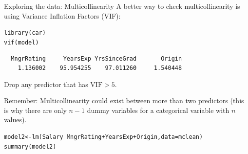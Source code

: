 \documentclass{beamer}\usepackage[]{graphicx}\usepackage[]{color}
\makeatletter
\newcommand{\hlopt}[1]{\textcolor[rgb]{1,0.894,0.769}{#1}}%
\newcommand{\hlstd}[1]{\textcolor[rgb]{1,0.894,0.769}{#1}}%
\newcommand{\hlkwb}[1]{\textcolor[rgb]{0.804,0.776,0.451}{#1}}%
\newcommand{\hlkwc}[1]{\textcolor[rgb]{0.78,0.941,0.545}{#1}}%
\newcommand{\hlkwd}[1]{\textcolor[rgb]{1,0.78,0.769}{#1}}%
\newenvironment{kframe}{%
 \def\at@end@of@kframe{}%
 \ifinner\ifhmode%
  \def\at@end@of@kframe{\end{minipage}}%
  \begin{minipage}{\columnwidth}%
 \fi\fi%
 \def\FrameCommand##1{\hskip\@totalleftmargin \hskip-\fboxsep
 \colorbox{shadecolor}{##1}\hskip-\fboxsep
     \hskip-\linewidth \hskip-\@totalleftmargin \hskip\columnwidth}%
 \MakeFramed {\advance\hsize-\width
   \@totalleftmargin\z@ \linewidth\hsize
   \@setminipage}}%
 {\par\unskip\endMakeFramed%
 \at@end@of@kframe}
\newenvironment{knitrout}{}{} %
\makeatother
\begin{document}
\begin{darkframes}
\begin{frame}[fragile]
\begin{knitrout}
\end{knitrout}
    \end{frame}
    
    
    

    \begin{frame}[fragile]{Exploring the data: Multicollinearity}      
      A better way to check multicollinearity is using Variance Inflation Factors (VIF):
\begin{knitrout}
\begin{kframe}
\begin{alltt}
\hlkwd{library}\hlstd{(car)}
\hlkwd{vif}\hlstd{(model)}
\end{alltt}
\begin{verbatim}
  MngrRating     YearsExp YrsSinceGrad       Origin 
    1.136002    95.954255    97.011260     1.540448 
\end{verbatim}
\end{kframe}
\end{knitrout}
      Drop any predictor that has $\text{VIF} > 5$.
      \pause  \bigskip
      
      \alert{Remember:} Multicollinearity could exist between more than two predictors (this is why there are only $n-1$ dummy variables for a categorical variable with $n$ values).  
   \end{frame}
    
    \begin{frame}[fragile]%
      \fontsize{9}{9}\selectfont
\begin{knitrout}
\begin{kframe}
\begin{alltt}
\hlstd{model2} \hlkwb{<-} \hlkwd{lm}\hlstd{(Salary} \hlopt{~} \hlstd{MngrRating} \hlopt{+} \hlstd{YearsExp} \hlopt{+} \hlstd{Origin,} \hlkwc{data}\hlstd{=mclean)}
\hlkwd{summary}\hlstd{(model2)}
\end{alltt}
\begin{verbatim}


\end{verbatim}
\end{kframe}
\end{knitrout}
\end{frame}
\end{darkframes}
\end{document}
